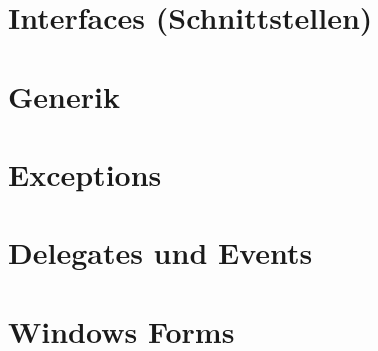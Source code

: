 \documentclass{scrreprt}
\begin{document}
\chapter{Interfaces (Schnittstellen)}


\chapter{Generik}


\chapter{Exceptions}


\chapter{Delegates und Events}


\chapter{Windows Forms}

\end{document}

